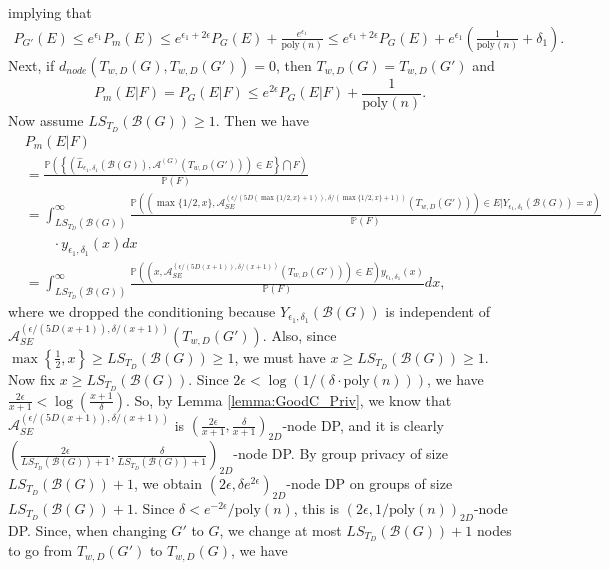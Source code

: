 \documentclass{article}
\begin{document}
implying that
\begin{align}
\label{eq:case_1}
P_{G'}(E) \leq e^{\epsilon_1}P_m(E) \leq e^{\epsilon_1 + 2\epsilon}P_G(E) +  \frac{e^{\epsilon_1}}{\mathrm{poly}(n)} \leq e^{\epsilon_1 + 2\epsilon}P_G(E) +  e^{\epsilon_1}\left(\frac{1}{\mathrm{poly}(n)} + \delta_1\right).
\end{align}
Next, if $d_{node}(T_{w,D}(G), T_{w,D}(G')) = 0$, then $T_{w,D}(G) = T_{w,D}(G')$ and
\begin{equation*}
P_m(E|F) = P_G(E|F) \leq e^{2\epsilon}P_{G}(E|F) + \frac{1}{\mathrm{poly}(n)}.
\end{equation*}
Now assume $LS_{T_D}(\mathcal{B}(G)) \geq 1$. Then we have
\begin{align*}
&P_{m}(E|F)\\
&= \frac{\mathbb{P}\left(\left\{(\hat{L}_{\epsilon_1, \delta_1}(\mathcal{B}(G)), \mathcal{A}^{(G)}(T_{w, D}(G')))\in E\right\} \bigcap F\right)}{\mathbb{P}(F)}\\
&= \int_{LS_{{T_{D}}}(\mathcal{B}(G))}^{\infty}\frac{\mathbb{P}\left((\max\{1/2, x\}, \mathcal{A}_{SE}^{(\epsilon/(5D(\max\{1/2, x\} + 1)), \delta/(\max\{1/2, x\} + 1))}(T_{w, D}(G'))) \in E|Y_{\epsilon_1, \delta_1}(\mathcal{B}(G)) = x\right)}{\mathbb{P}(F)} \\
%
& \qquad \cdot y_{\epsilon_1, \delta_1}(x) dx\\
&= \int_{LS_{{T_{D}}}(\mathcal{B}(G))}^{\infty}\frac{\mathbb{P}\left((x, \mathcal{A}_{SE}^{(\epsilon/(5D(x + 1)), \delta/(x + 1))}(T_{w, D}(G'))) \in E\right)y_{\epsilon_1, \delta_1}(x)}{\mathbb{P}(F)}dx,
\end{align*}
where we dropped the conditioning because $Y_{\epsilon_1, \delta_1}(\mathcal{B}(G))$ is independent of $\mathcal{A}_{SE}^{(\epsilon/(5D(x + 1)), \delta/(x + 1))}(T_{w, D}(G'))$. Also, since $\max\left\{\frac{1}{2}, x\right\} \geq LS_{T_D}(\mathcal{B}(G)) \geq 1$, we must have $x \geq LS_{T_D}(\mathcal{B}(G)) \geq 1$. Now fix $x \geq LS_{{T_{D}}}(\mathcal{B}(G))$. Since $2\epsilon < \log(1/(\delta \cdot \mathrm{poly}(n)))$, we have $\frac{2\epsilon}{x + 1} < \log\left(\frac{x + 1}{\delta}\right)$. So, by Lemma \ref{lemma:GoodC_Priv}, we know that $\mathcal{A}_{SE}^{(\epsilon/(5D(x + 1)), \delta/(x + 1))}$ is $\left(\frac{2\epsilon}{x + 1}, \frac{\delta}{x + 1}\right)_{2D}$-node DP, and it is clearly $\left(\frac{2\epsilon}{LS_{T_{D}}(\mathcal{B}(G)) + 1}, \frac{\delta}{LS_{T_{D}}(\mathcal{B}(G)) + 1}\right)_{2D}$-node DP. By group privacy of size $LS_{T_{D}}(\mathcal{B}(G)) + 1$, we obtain $\left(2\epsilon, \delta e^{2\epsilon}\right)_{2D}$-node DP on groups of size $LS_{T_{D}}(\mathcal{B}(G)) + 1$. Since $\delta < e^{-2\epsilon}/\mathrm{poly}(n)$, this is $(2\epsilon, 1/\mathrm{poly}(n))_{2D}$-node DP. Since, when changing $G'$ to $G$, we change at most $LS_{T_{D}}(\mathcal{B}(G)) + 1$ nodes to go from $T_{w, D}(G')$ to $T_{w, D}(G)$, we have
\end{document}

